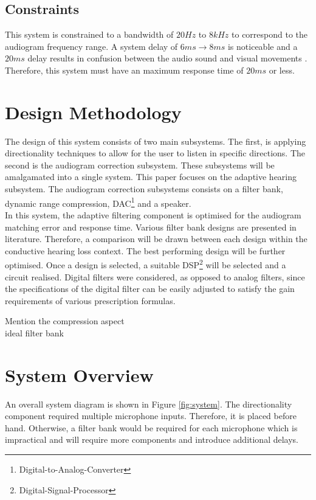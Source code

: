 \documentclass[12pt, onecolumn]{article}
\begin{document}
\subsection{Constraints}

\noindent This system is constrained to a bandwidth of $20Hz$ to $8kHz$ to correspond to the audiogram frequency range. A system delay of $6ms \rightarrow 8ms$ is noticeable and a $20ms$ delay results in confusion between the audio sound and visual movements \cite{brennan}. Therefore, this system must have an maximum response time of $20ms$ or less. 

\section{Design Methodology}

\noindent The design of this system consists of two main subsystems. The first, is applying directionality techniques to allow for the user to listen in specific directions. The second is the audiogram correction subsystem. These subsystems will be amalgamated into a single system. This paper focuses on the adaptive hearing subsystem. The audiogram correction subsystems consists on a filter bank, dynamic range compression, DAC\footnote{Digital-to-Analog-Converter} and a speaker. \\
\newline
\noindent In this system, the adaptive filtering component is optimised for the audiogram matching error and response time. Various filter bank designs are presented in literature. Therefore, a comparison will be drawn between each design within the conductive hearing loss context. The best performing design will be further optimised. Once a design is selected, a suitable DSP\footnote{Digital-Signal-Processor} will be selected and a circuit realised. Digital filters were considered, as opposed to analog filters, since the specifications of the digital filter can be easily adjusted to satisfy the gain requirements of various prescription formulas.


Mention the compression aspect\\

ideal filter bank

\section{System Overview}

\noindent An overall system diagram is shown in Figure \ref{fig:system}. The directionality component required multiple microphone inputs. Therefore, it is placed before hand. Otherwise, a filter bank would be required for each microphone which is impractical and will require more components and introduce additional delays.
\end{document}
